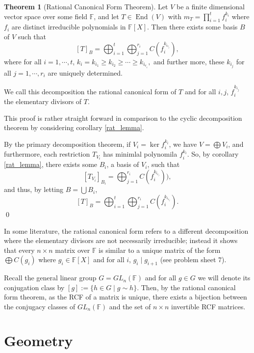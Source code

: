 \documentclass[
]{article}
\theoremstyle{definition}
\newtheorem{theorem}{Theorem}
\theoremstyle{definition}
\begin{document}
\begin{theorem}[Rational Canonical Form Theorem]
  Let \(V\) be a finite dimensional vector space over some field \(\mathbb{F}\), 
  and let \(T \in \mathop{\mathrm{End}}(V)\) with \(m_T = \prod_{i = 1}^t f_i^{k_i}\) where \(f_i\) 
  are distinct irreducible polynomials in \(\mathbb{F}[X]\). Then there exists 
  some basis \(B\) of \(V\) such that 
  \[[T]_B = \bigoplus_{i = 1}^t \bigoplus_{j = 1}^{r_i} C(f_i^{k_{i_{r_j}}}),\]
  where for all \(i = 1, \cdots, t\), \(k_i = k_{i_1} \ge k_{i_2} \ge \cdots 
  \ge k_{i_{r_i}},\) and further more, these \(k_{i_j}\) for all 
  \(j = 1, \cdots, r_i\) are uniquely determined. 
\end{theorem}

We call this decomposition the rational canonical form of \(T\) and for
all \(i, j\), \(f_i^{k_{i_j}}\) the elementary divisors of \(T\).

\proof

This proof is rather straight forward in comparison to the cyclic
decomposition theorem by considering corollary \ref{rat_lemma}.

By the primary decomposition theorem, if \(V_i = \ker f_i^{k_i}\), we
have \(V = \bigoplus V_i\), and furthermore, each restriction
\(T_{V_i}\) has minimlal polynomila \(f_i^{k_i}\). So, by corollary
\ref{rat_lemma}, there exists some \(B_i\), a basis of \(V_i\), such
that
\[[T_{V_i}]_{B_i} = \bigoplus_{j = 1}^{r_i} C(f_i^{k_{i_{r_j}}})),\] and
thus, by letting \(B = \bigcup B_i\),
\[[T]_B = \bigoplus_{i = 1}^t \bigoplus_{j = 1}^{r_i} C(f_i^{k_{i_{r_j}}}).\]
\qed

In some literature, the rational canonical form refers to a different
decomposition where the elementary divisors are not necessarily
irreducible; instead it shows that every \(n \times n\) matrix over
\(\mathbb{F}\) is similar to a unique matrix of the form
\(\bigoplus C(g_i)\) where \(g_i \in \mathbb{F}[X]\) and for all \(i\),
\(g_i \mid g_{i + 1}\) (see problem sheet 7).

Recall the general linear group \(G = GL_n(\mathbb{F})\) and for all
\(g \in G\) we will denote its conjugation class by
\([g] := \{h \in G \mid g \sim h\}\). Then, by the rational canonical
form theorem, as the RCF of a matrix is unique, there exists a bijection
between the conjugacy classes of \(GL_n(\mathbb{F})\) and the set of
\(n \times n\) invertible RCF matrices.

\newpage

\hypertarget{geometry-1}{%
\section{Geometry}\label{geometry-1}}
\end{document}
